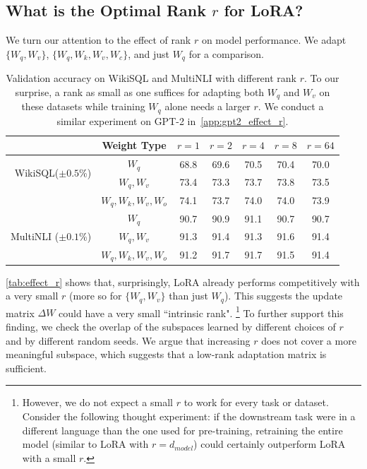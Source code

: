 \documentclass{article} %
\begin{document}
\subsection{What is the Optimal Rank $r$ for LoRA?}
\label{sec:effect_of_r}

We turn our attention to the effect of rank $r$ on model performance.
We adapt $\{W_q, W_v\}$, $\{W_q, W_k, W_v, W_c\}$, and just $W_q$ for a comparison.



\begin{table}[h]
  \centering
  \begin{tabular}{r|c|ccccc}
  \hline
  \toprule
                                        & Weight Type           & $r=1$  & $r=2$  & $r=4$  & $r=8$  & $r=64$  \\
  \midrule
  \multirow{2}{*}{WikiSQL($\pm0.5$\%)}  & $W_{q}$               & 68.8   & 69.6   & 70.5   & 70.4   & 70.0    \\
                                        & $W_q, W_v$            & 73.4   & 73.3   & 73.7   & 73.8   & 73.5    \\
                                        & $W_q, W_k, W_v, W_o$  & 74.1   & 73.7   & 74.0   & 74.0   & 73.9    \\
  \midrule
  \multirow{3}{*}{MultiNLI ($\pm0.1$\%)}& $W_q$                 & 90.7   & 90.9   & 91.1   & 90.7   & 90.7    \\
                                        & $W_q, W_v$            & 91.3   & 91.4   & 91.3   & 91.6   & 91.4    \\
                                        & $W_q, W_k, W_v, W_o$  & 91.2   & 91.7   & 91.7   & 91.5   & 91.4    \\

  \bottomrule
  \end{tabular}
  \caption{Validation accuracy on WikiSQL and MultiNLI with different rank $r$. To our surprise, a rank as small as one suffices for adapting both $W_q$ and $W_v$ on these datasets while training $W_q$ alone needs a larger $r$. We conduct a similar experiment on GPT-2 in~\autoref{app:gpt2_effect_r}.}
  \label{tab:effect_r}
\end{table}

\autoref{tab:effect_r} shows that, surprisingly, LoRA already performs competitively with a very small $r$ (more so for $\{W_q, W_v\}$ than just $W_q$).
This suggests the update matrix $\Delta W$ could have a very small ``intrinsic rank".%
\footnote{However, we do not expect a small $r$ to work for every task or dataset.
Consider the following thought experiment: if the downstream task were in a different language than the one used for pre-training, retraining the entire model (similar to LoRA with $r=d_{model}$) could certainly outperform LoRA with a small $r$.}
To further support this finding, we check the overlap of the subspaces learned by different choices of $r$ and by different random seeds. We argue that increasing $r$ does not cover a more meaningful subspace, which suggests that a low-rank adaptation matrix is sufficient.
\end{document}

